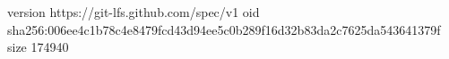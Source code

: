 version https://git-lfs.github.com/spec/v1
oid sha256:006ee4c1b78c4e8479fcd43d94ee5c0b289f16d32b83da2c7625da543641379f
size 174940
